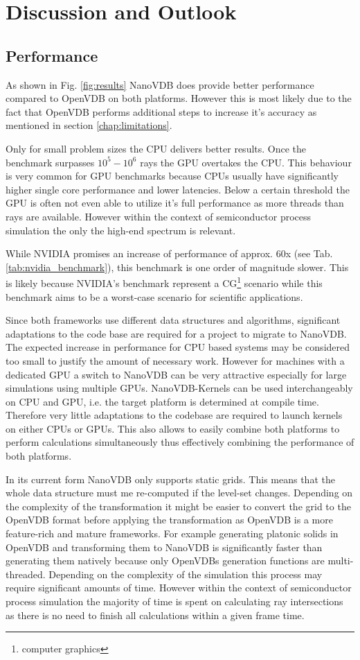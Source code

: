 \section{Discussion and Outlook}
\subsection{Performance}
As shown in Fig. \ref{fig:results} NanoVDB does provide better performance compared to OpenVDB on both platforms.
However this is most likely due to the fact that OpenVDB performs additional steps to increase it's accuracy as mentioned in section \ref{chap:limitations}.

Only for small problem sizes the CPU delivers better results.
Once the benchmark surpasses $10^5 - 10^6$ rays the GPU overtakes the CPU.
This behaviour is very common for GPU benchmarks because CPUs usually have significantly higher single core performance and lower latencies.
Below a certain threshold the GPU is often not even able to utilize it's full performance as more threads than rays are available.
However within the context of semiconductor process simulation the only the high-end spectrum is relevant.

While NVIDIA promises an increase of performance of approx. 60x (see Tab. \ref{tab:nvidia_benchmark}), this benchmark is one order of magnitude slower.
This is likely because NVIDIA's benchmark represent a CG\footnote{computer graphics} scenario while this benchmark aims to be a worst-case scenario for scientific applications.

Since both frameworks use different data structures and algorithms, significant adaptations to the code base are required for a project to migrate to NanoVDB.
The expected increase in performance for CPU based systems may be considered too small to justify the amount of necessary work.
However for machines with a dedicated GPU a switch to NanoVDB can be very attractive especially for large simulations using multiple GPUs.
NanoVDB-Kernels can be used interchangeably on CPU and GPU, i.e. the target platform is determined at compile time.
Therefore very little adaptations to the codebase are required to launch kernels on either CPUs or GPUs.
This also allows to easily combine both platforms to perform calculations simultaneously thus effectively combining the performance of both platforms.

In its current form NanoVDB only supports static grids.
This means that the whole data structure must me re-computed if the level-set changes.
Depending on the complexity of the transformation it might be easier to convert the grid to the OpenVDB format before applying the transformation as OpenVDB is a more feature-rich and mature frameworks.
For example generating platonic solids in OpenVDB and transforming them to NanoVDB is significantly faster than generating them natively because only OpenVDBs generation functions are multi-threaded.
Depending on the complexity of the simulation this process may require significant amounts of time.
However within the context of semiconductor process simulation the majority of time is spent on calculating ray intersections as there is no need to finish all calculations within a given frame time.

